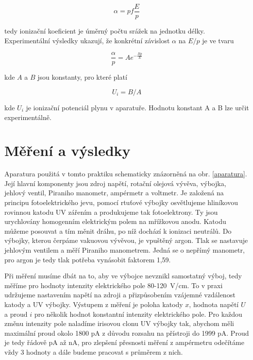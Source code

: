 \documentclass[a4paper,12pt]{article}
\begin{document}
\begin{equation}
	\alpha = p f \frac{E}{p}
	\label{4}
\end{equation}

tedy ionizační koeficient je úměrný počtu srážek na jednotku délky. Experimentální výsledky ukazují, že konkrétní závislost $\alpha$ na $E/p$ je ve tvaru

\begin{equation}
	\frac{\alpha}{p} = A e^{-\frac{Bp}{E}} 
	\label{5}
\end{equation}

kde $A$ a $B$ jsou konstanty, pro které platí

\begin{equation}
	U_i = B/A
	\label{6}
\end{equation}

kde $U_i$ je ionizační potenciál plynu v aparatuře. Hodnotu konstant A a B lze určit experimentálně.

\section{Měření a výsledky}

Aparatura použitá v tomto praktiku schematicky znázorněná na obr. \ref{aparatura}. Její hlavní komponenty jsou zdroj napětí, rotační olejová vývěva, výbojka, jehlový ventil, Piraniho manometr, ampérmetr a voltmetr. Je založená na principu fotoelektrického jevu, pomocí rtuťové výbojky osvětlujeme hliníkovou rovinnou katodu UV zářením a produkujeme tak fotoelektrony. Ty jsou urychlovány homogenním elektrickým polem na mřížkovou anodu. Katodu můžeme posouvat a tím měnit dráhu, po níž dochází k ionizaci neutrálů. Do výbojky, kterou čerpáme vakuovou vývěvou, je vpuštěný argon. Tlak se nastavuje jehlovým ventilem a měří Piraniho manometrem. Jedná se o nepřímý manometr, pro argon je tedy tlak potřeba vynásobit faktorem 1,59.

Při měření musíme dbát na to, aby ve výbojce nevznikl samostatný výboj, tedy měříme pro hodnoty intenzity elektrického pole 80-120~V/cm. To v praxi udržujeme nastavením napětí na zdroji a přizpůsobením vzájemné vzdálenost katody a UV výbojky. Výstupem z měření je poloha katody $x$, hodnota napětí $U$ a proud $i$ pro několik hodnot konstantní intenzity elektrického pole. Pro každou změnu intenzity pole naladíme irisovou clonu UV výbojky tak, abychom měli maximální proud okolo 1800 pA z důvodu rozsahu na přístroji do 1999 pA. Proud je tedy řádově pA až nA, pro zlepšení přesnosti měření z ampérmetru odečítáme vždy 3 hodnoty a dále budeme pracovat s průměrem z nich.
\end{document}
